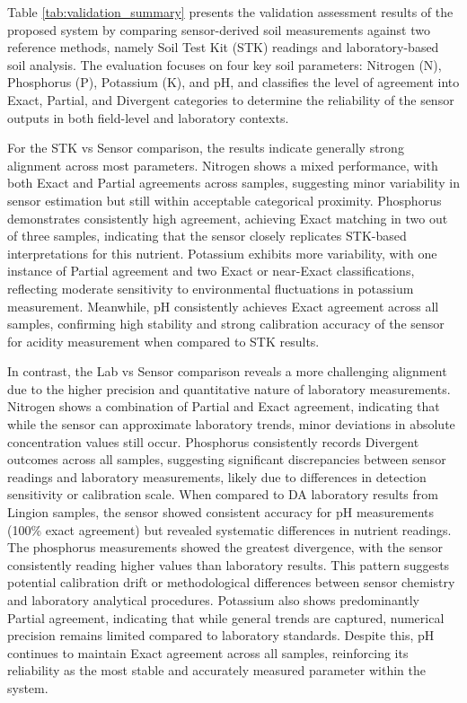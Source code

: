 {	Table \ref{tab:validation_summary} presents the validation assessment results of the proposed system by comparing sensor-derived soil measurements against two reference methods, namely Soil Test Kit (STK) readings and laboratory-based soil analysis. The evaluation focuses on four key soil parameters: Nitrogen (N), Phosphorus (P), Potassium (K), and pH, and classifies the level of agreement into Exact, Partial, and Divergent categories to determine the reliability of the sensor outputs in both field-level and laboratory contexts.
	
	For the STK vs Sensor comparison, the results indicate generally strong alignment across most parameters. Nitrogen shows a mixed performance, with both Exact and Partial agreements across samples, suggesting minor variability in sensor estimation but still within acceptable categorical proximity. Phosphorus demonstrates consistently high agreement, achieving Exact matching in two out of three samples, indicating that the sensor closely replicates STK-based interpretations for this nutrient. Potassium exhibits more variability, with one instance of Partial agreement and two Exact or near-Exact classifications, reflecting moderate sensitivity to environmental fluctuations in potassium measurement. Meanwhile, pH consistently achieves Exact agreement across all samples, confirming high stability and strong calibration accuracy of the sensor for acidity measurement when compared to STK results.
	
	In contrast, the Lab vs Sensor comparison reveals a more challenging alignment due to the higher precision and quantitative nature of laboratory measurements. Nitrogen shows a combination of Partial and Exact agreement, indicating that while the sensor can approximate laboratory trends, minor deviations in absolute concentration values still occur. Phosphorus consistently records Divergent outcomes across all samples, suggesting significant discrepancies between sensor readings and laboratory measurements, likely due to differences in detection sensitivity or calibration scale. When compared to DA laboratory results from Lingion samples, the sensor showed consistent accuracy for pH measurements (100\% exact agreement) but revealed systematic differences in nutrient readings. The phosphorus measurements showed the greatest divergence, with the sensor consistently reading higher values than laboratory results. This pattern suggests potential calibration drift or methodological differences between sensor chemistry and laboratory analytical procedures. Potassium also shows predominantly Partial agreement, indicating that while general trends are captured, numerical precision remains limited compared to laboratory standards. Despite this, pH continues to maintain Exact agreement across all samples, reinforcing its reliability as the most stable and accurately measured parameter within the system.
	
}
